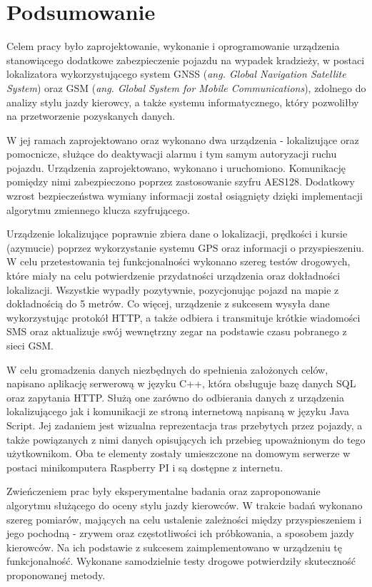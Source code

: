 \chapter{Podsumowanie}
\label{summary}

Celem pracy było zaprojektowanie, wykonanie i oprogramowanie urządzenia stanowiącego dodatkowe zabezpieczenie pojazdu na wypadek kradzieży, w postaci lokalizatora wykorzystującego system GNSS (\textit{ang. Global Navigation Satellite System}) oraz GSM (\textit{ang. Global System for Mobile Communications}), zdolnego do analizy stylu jazdy kierowcy, a także systemu informatycznego, który pozwoliłby na przetworzenie pozyskanych danych.

W jej ramach zaprojektowano oraz wykonano dwa urządzenia - lokalizujące oraz pomocnicze, służące do deaktywacji alarmu i tym samym autoryzacji ruchu pojazdu. Urządzenia zaprojektowano, wykonano i uruchomiono. Komunikację pomiędzy nimi zabezpieczono poprzez zastosowanie szyfru AES128. Dodatkowy wzrost bezpieczeństwa wymiany informacji został osiągnięty dzięki implementacji algorytmu zmiennego klucza szyfrującego.

Urządzenie lokalizujące poprawnie zbiera dane o lokalizacji, prędkości i kursie (azymucie) poprzez wykorzystanie systemu GPS oraz informacji o przyspieszeniu. W celu przetestowania tej funkcjonalności wykonano szereg testów drogowych, które miały na celu potwierdzenie przydatności urządzenia oraz dokładności lokalizacji. Wszystkie wypadły pozytywnie, pozycjonując pojazd na mapie z dokładnością do 5 metrów. Co więcej, urządzenie z sukcesem wysyła dane wykorzystując protokół HTTP, a także odbiera i transmituje krótkie wiadomości SMS oraz aktualizuje swój wewnętrzny zegar na podstawie czasu pobranego z sieci GSM.

W celu gromadzenia danych niezbędnych do spełnienia założonych celów, napisano aplikację serwerową w języku C++, która obsługuje bazę danych SQL oraz zapytania HTTP. Służą one zarówno do odbierania danych z urządzenia lokalizującego jak i komunikacji ze stroną internetową napisaną w języku Java Script. Jej zadaniem jest wizualna reprezentacja tras przebytych przez pojazdy, a także powiązanych z nimi danych opisujących ich przebieg upoważnionym do tego użytkownikom. Oba te elementy zostały umieszczone na domowym serwerze w postaci minikomputera Raspberry PI i są dostępne z internetu. 

Zwieńczeniem prac były eksperymentalne badania oraz zaproponowanie algorytmu służącego do oceny stylu jazdy kierowców. W trakcie badań wykonano szereg pomiarów, mających na celu ustalenie zależności między przyspieszeniem i jego pochodną - zrywem oraz częstotliwości ich próbkowania, a sposobem jazdy kierowców. Na ich podstawie z sukcesem zaimplementowano w urządzeniu tę funkcjonalność. Wykonane samodzielnie testy drogowe potwierdziły skuteczność proponowanej metody.

